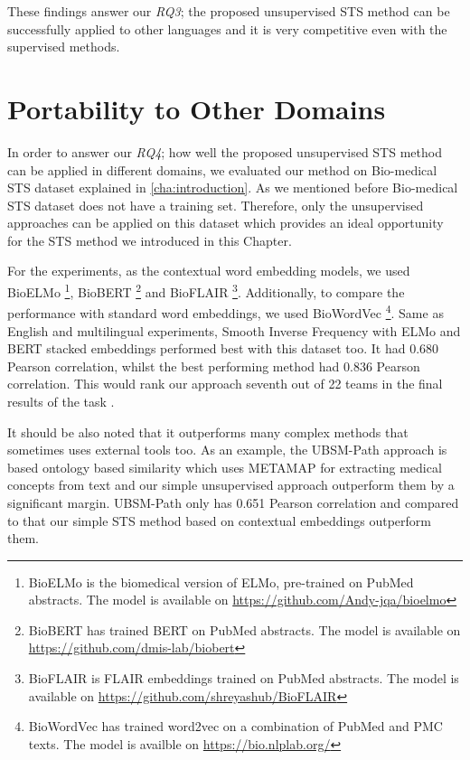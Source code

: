 These findings answer our \textit{RQ3}; the proposed unsupervised STS method can be successfully applied to other languages and it is very competitive even with the supervised methods. 


\section{Portability to Other Domains}
\label{sec:state_domains}
In order to answer our \textit{RQ4}; how well the proposed unsupervised STS method can be applied in different domains, we evaluated our method on Bio-medical STS dataset explained in \ref{cha:introduction}. As we mentioned before Bio-medical STS dataset does not have a training set. Therefore, only the unsupervised approaches can be applied on this dataset which provides an ideal opportunity for the STS method we introduced in this Chapter. 

For the experiments, as the contextual word embedding models, we used BioELMo \cite{jin2019probing}\footnote{BioELMo is the biomedical version of ELMo, pre-trained on PubMed abstracts. The model is available on \url{https://github.com/Andy-jqa/bioelmo}}, BioBERT \cite{10.1093/bioinformatics/btz682}\footnote{BioBERT has trained BERT on PubMed abstracts. The model is available on \url{https://github.com/dmis-lab/biobert}} and BioFLAIR \cite{sharma2019bioflair}\footnote{BioFLAIR is FLAIR embeddings trained on PubMed abstracts. The model is available on \url{https://github.com/shreyashub/BioFLAIR}}. Additionally, to compare the performance with standard word embeddings, we used BioWordVec \cite{Zhang2019}\footnote{BioWordVec has trained word2vec on a combination of PubMed and PMC texts. The model is availble on \url{https://bio.nlplab.org/}}. Same as English and multilingual experiments, Smooth Inverse Frequency with ELMo and BERT stacked embeddings performed best with this dataset too. It had 0.680 Pearson correlation, whilst the best performing method had 0.836 Pearson correlation. This would rank our approach seventh out of 22 teams in the final results of the task \cite{10.1093/bioinformatics/btx238}.

It should be also noted that it outperforms many complex methods that sometimes uses external tools too. As an example, the UBSM-Path approach is based ontology based similarity which uses METAMAP \cite{Aronson2001} for extracting medical concepts from text and our simple unsupervised approach outperform them by a significant margin. UBSM-Path only has 0.651 Pearson correlation and compared to that our simple STS method based on contextual embeddings outperform them. 

